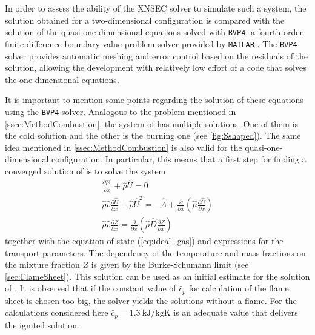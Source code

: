 In order to assess the ability of the XNSEC solver to simulate such a system, the solution obtained for a two-dimensional configuration is compared with the solution of the quasi one-dimensional equations solved with \lstinline|BVP4|, a fourth order finite difference boundary value problem solver provided by \lstinline|MATLAB| \parencite{kierzenkaBVPSolverBased2001}. The \lstinline|BVP4| solver provides automatic meshing and error control based on the residuals of the solution, allowing the development with relatively low effort of a code that solves the one-dimensional equations.

It is important to mention some points regarding the solution of these equations using the \lstinline|BVP4| solver. Analogous to the problem mentioned in \cref{ssec:MethodCombustion}, the system of   has multiple solutions. One of them is the cold solution and the other is the burning one (see \cref{fig:Sshaped}). The same idea mentioned in \cref{ssec:MethodCombustion} is also valid for the quasi-one-dimensional configuration. In particular, this means that a first step for finding a converged solution of  is to solve the system
\begin{subequations}
\begin{gather}
\frac{\partial \hat \rho \hat v}{\partial \hat x} +  \hat \rho \hat U = 0\\ \label{eq:OneDimCont2}%
\hat \rho \hat v \frac{\partial \hat U}{\partial \hat x} + \hat \rho \hat U^2 =
- \hat \Lambda
+ \frac{\partial}{\partial \hat x}\left(\hat \mu \frac{\partial \hat U}{\partial \hat x}\right)\\ \label{eq:OneDimMom2}%
\hat \rho \hat v \frac{\partial Z}{\partial \hat x} = 
\frac{\partial}{\partial \hat x}\left(\hat \rho \hat D \frac{\partial Z}{\partial \hat x}\right)
\end{gather}\label{eqs:OneDimEquationsMixtureFraction}
\end{subequations}
together with the equation of state (\cref{eq:ideal_gas}) and expressions for the transport parameters. The dependency of the temperature and mass fractions on the mixture fraction $Z$ is given by the Burke-Schumann limit (see \cref{sec:FlameSheet}). This solution can be used as an initial estimate for the solution of . It is observed that if the constant value of $\hat c_p$ for calculation of the flame sheet is chosen too big, the solver yields the solutions without a flame. For the calculations considered here $\hat c_p =\SI{1.3}{\kilo \joule\per\kilogram \kelvin}$ is an adequate value that delivers the ignited solution.

